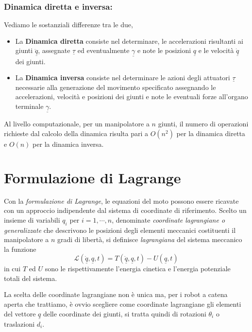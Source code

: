 \subsubsection{Dinamica diretta e inversa:}
Vediamo le sostanziali differenze tra le due,
\begin{itemize}
	\item La \textbf{Dinamica diretta} consiste nel determinare, le accelerazioni risultanti ai giunti $\ddot{\underline{q}}$, assegnate $\underline{\tau}$ ed eventualmente $\underline{\gamma}$ e note le posizioni $\underline{q}$ e le velocità $\dot{\underline{q}}$ dei giunti.
	\item La \textbf{Dinamica inversa} consiste nel determinare le azioni degli attuatori $\underline{\tau}$ necessarie alla generazione del movimento specificato assegnando le accelerazioni, velocità e posizioni dei giunti e note le eventuali forze all'organo terminale $\underline{\gamma}$.
\end{itemize}

Al livello computazionale, per un manipolatore a $n$ giunti, il numero di operazioni richieste dal calcolo della dinamica risulta pari a $O(n^2)$ per la dinamica diretta e $O(n)$ per la dinamica inversa. 

\section{Formulazione di Lagrange}
Con la \emph{formulazione di Lagrange}, le equazioni del moto possono essere ricavate con un approccio indipendente dal sistema di coordinate di riferimento. Scelto un insieme di variabili $q_i$ per $i = 1, \cdots, n$, denominate \emph{coordinate lagrangiane o generalizzate} che descrivono le posizioni degli elementi meccanici costituenti il manipolatore a $n$ gradi di libertà, si definisce \emph{lagrangiana} del sistema meccanico la funzione
\begin{equation}
	\mathcal{L}(\underline{\dot{q}}, \underline{q}, t) = T(\underline{\dot{q}}, \underline{q}, t) - U(\underline{q}, t)
\end{equation} 
in cui $T$ ed $U$ sono le rispettivamente l'energia cinetica e l'energia potenziale totali del sistema.

La scelta delle coordinate lagrangiane non è unica ma, per i robot a catena aperta che trattiamo, è ovvio scegliere come coordinate lagrangiane gli elementi del vettore $\underline{q}$ delle coordinate dei giunti, si tratta quindi di rotazioni $\theta_i$ o traslazioni $d_i$.


